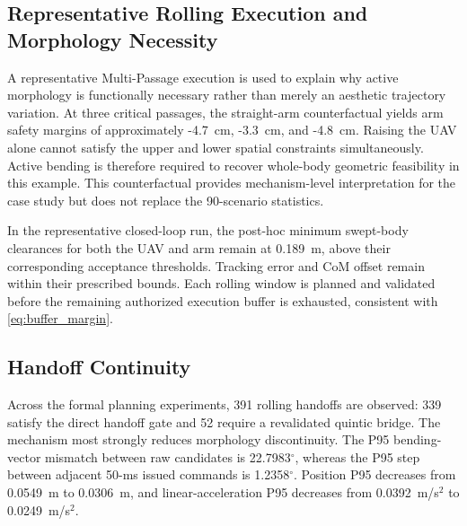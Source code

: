 \documentclass[journal,twoside]{IEEEtran}
\begin{document}
\subsection{Representative Rolling Execution and Morphology Necessity}
A representative Multi-Passage execution is used to explain why active morphology is functionally necessary rather than merely an aesthetic trajectory variation. At three critical passages, the straight-arm counterfactual yields arm safety margins of approximately -4.7~cm, -3.3~cm, and -4.8~cm. Raising the UAV alone cannot satisfy the upper and lower spatial constraints simultaneously. Active bending is therefore required to recover whole-body geometric feasibility in this example. This counterfactual provides mechanism-level interpretation for the case study but does not replace the 90-scenario statistics.

In the representative closed-loop run, the post-hoc minimum swept-body clearances for both the UAV and arm remain at 0.189~m, above their corresponding acceptance thresholds. Tracking error and CoM offset remain within their prescribed bounds. Each rolling window is planned and validated before the remaining authorized execution buffer is exhausted, consistent with \eqref{eq:buffer_margin}.

\subsection{Handoff Continuity}
Across the formal planning experiments, 391 rolling handoffs are observed: 339 satisfy the direct handoff gate and 52 require a revalidated quintic bridge. The mechanism most strongly reduces morphology discontinuity. The P95 bending-vector mismatch between raw candidates is 22.7983$^\circ$, whereas the P95 step between adjacent 50-ms issued commands is 1.2358$^\circ$. Position P95 decreases from 0.0549~m to 0.0306~m, and linear-acceleration P95 decreases from 0.0392~m/s$^2$ to 0.0249~m/s$^2$.
\end{document}
